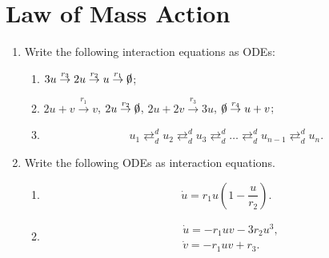 \documentclass[]{article}
\newcommand{\bb}{\begin{equation}}
\newcommand{\ee}{\end{equation}}
\renewcommand{\l}{\left(}
\renewcommand{\r}{\right)}
\begin{document}
\section{Law of Mass Action}
\begin{enumerate}
\item Write the following interaction equations as ODEs:
\begin{enumerate}
\item $3u\stackrel{r_3}{\rightarrow}2u\stackrel{r_2}{\rightarrow}u\stackrel{r_1}{\rightarrow}\slashed{0}$;
\item $2u+v\stackrel{r_1}{\rightarrow}v$, $2u\stackrel{r_2}{\rightarrow}\slashed{0}$, $2u+2v\stackrel{r_3}{\rightarrow}3u$, $\slashed{0}\stackrel{r_4}{\rightarrow}u+v$;
\item
\bb
u_1\mathrel{\mathop{\rightleftarrows}^{d}_{d}}u_2\mathrel{\mathop{\rightleftarrows}^{d}_{d}}u_3\mathrel{\mathop{\rightleftarrows}^{d}_{d}}\dots\mathrel{\mathop{\rightleftarrows}^{d}_{d}}u_{n-1}\mathrel{\mathop{\rightleftarrows}^{d}_{d}}u_n\nonumber.
\ee
\end{enumerate}

\item Write the following ODEs as interaction equations.
\begin{enumerate}
\item
\bb
\dot{u}=r_1u\l 1- \frac{u}{r_2}\r\nonumber.
\ee
\item
\begin{align}
&\dot{u}=-r_1uv-3r_2u^3,\nonumber\\
&\dot{v}=-r_1uv+r_3.\nonumber
\end{align}
\end{enumerate}
\end{enumerate}
\end{document}
